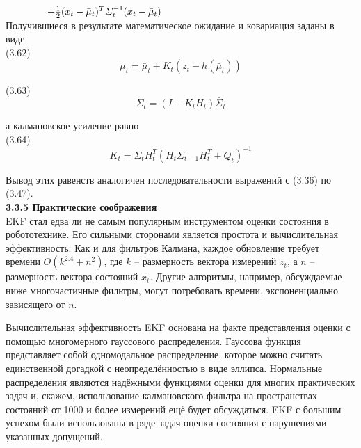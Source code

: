 \documentclass[10pt,a4paper]{article}
\begin{document}
$\hspace{15mm}+\frac{1}{2}(x_t-\bar{\mu}_t)^T \bar{\varSigma}_t^{-1}(x_t-\bar{\mu}_t)$\\

Получившиеся в результате математическое ожидание и ковариация заданы в виде\\

(3.62)
$$\mu_t=\bar{\mu}_t+K_t(z_t-h(\bar{\mu}_t))$$

(3.63)
$$\varSigma_t=(I-K_t H_t)\bar{\varSigma}_t$$

а калмановское усиление равно\\

(3.64)
$$K_t=\bar{\varSigma}_t H_t^T(H_t\bar{\varSigma}_{t-1}H_t^T+Q_t)^{-1}$$

Вывод этих равенств аналогичен последовательности выражений с (3.36) по (3.47).\\

\textbf{3.3.5 Практические соображения}\\

EKF стал едва ли не самым популярным инструментом оценки состояния в робототехнике. Его сильными сторонами является простота и вычислительная эффективность. Как и для фильтров Калмана, каждое обновление требует времени $O(k^{2.4} + n^2)$, где $k$ – размерность вектора измерений $z_t$, а $n$ – размерность вектора состояний $x_t$. Другие алгоритмы, например, обсуждаемые ниже многочастичные фильтры, могут потребовать времени, экспоненциально зависящего от $n$.

Вычислительная эффективность EKF основана на факте представления оценки с помощью многомерного гауссового распределения. Гауссова функция представляет собой одномодальное распределение, которое можно считать единственной догадкой с неопределённостью в виде эллипса. Нормальные распределения являются надёжными функциями оценки для многих практических задач и, скажем, использование калмановского фильтра на пространствах состояний от 1000 и более измерений ещё будет обсуждаться. EKF с большим успехом были использованы в ряде задач оценки состояния с нарушениями указанных допущений.
\end{document}
